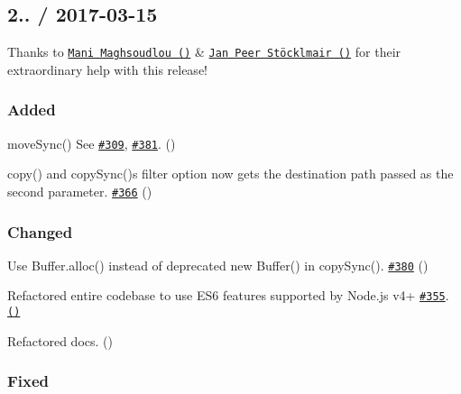 \subsection*{2.. / 2017-\/03-\/15 }

Thanks to \href{https://github.com/manidlou}{\tt Mani Maghsoudlou ()} \& \href{https://github.com/JPeer264}{\tt Jan Peer Stöcklmair ()} for their extraordinary help with this release!

\subsubsection*{Added}


\begin{DoxyItemize}
\item {\ttfamily move\+Sync()} See \href{https://github.com/jprichardson/node-fs-extra/issues/309}{\tt \#309}, \href{https://github.com/jprichardson/node-fs-extra/pull/381}{\tt \#381}. (\href{https://github.com/manidlou}{\tt })
\item {\ttfamily copy()} and {\ttfamily copy\+Sync()}\textquotesingle{}s {\ttfamily filter} option now gets the destination path passed as the second parameter. \href{https://github.com/jprichardson/node-fs-extra/pull/366}{\tt \#366} (\href{https://github.com/manidlou}{\tt })
\end{DoxyItemize}

\subsubsection*{Changed}


\begin{DoxyItemize}
\item Use {\ttfamily Buffer.\+alloc()} instead of deprecated {\ttfamily new Buffer()} in {\ttfamily copy\+Sync()}. \href{https://github.com/jprichardson/node-fs-extra/pull/380}{\tt \#380} (\href{https://github.com/manidlou}{\tt })
\item Refactored entire codebase to use E\+S6 features supported by Node.\+js v4+ \href{https://github.com/jprichardson/node-fs-extra/issues/355}{\tt \#355}. \href{https://github.com/JPeer264}{\tt ()}
\item Refactored docs. (\href{https://github.com/manidlou}{\tt })
\end{DoxyItemize}

\subsubsection*{Fixed}


